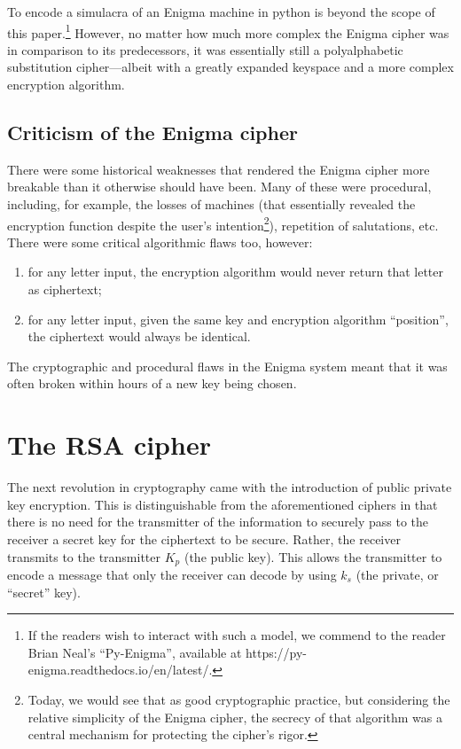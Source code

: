 \documentclass{AIAA}
\begin{document}
To encode a simulacra of an Enigma machine in python is beyond the scope of this paper.\footnote{If the readers wish to interact with such a model, we commend to the reader Brian Neal's ``Py-Enigma'', available at https://py-enigma.readthedocs.io/en/latest/.}  However, no matter how much more complex the Enigma cipher was in comparison to its predecessors, it was essentially still a polyalphabetic substitution cipher---albeit with a greatly expanded keyspace and a more complex encryption algorithm.

\subsection{Criticism of the Enigma cipher}

There were some historical weaknesses that rendered the Enigma cipher more breakable than it otherwise should have been. Many of these were procedural, including, for example, the losses of machines (that essentially revealed the encryption function despite the user's intention\footnote{Today, we would see that as good cryptographic practice, but considering the relative simplicity of the Enigma cipher, the secrecy of that algorithm was a central mechanism for protecting the cipher's rigor.}), repetition of salutations, etc. There were some critical algorithmic flaws too, however:  
\begin{enumerate}
\item for any letter input, the encryption algorithm would never return that letter as ciphertext;
\item for any letter input, given the same key and encryption algorithm ``position'', the ciphertext would always be identical. 
\end{enumerate}
The cryptographic and procedural flaws in the Enigma system meant that it was often broken within hours of a new key being chosen.

\section{The RSA cipher}

The next revolution in cryptography came with the introduction of public private key encryption. This is distinguishable from the aforementioned ciphers in that there is no need for the transmitter of the information to securely pass to the receiver a secret key for the ciphertext to be secure. Rather, the receiver transmits to the transmitter $K_{p}$ (the public key). This allows the transmitter to encode a message that only the receiver can decode by using $k_{s}$ (the private, or ``secret'' key).
\end{document}

